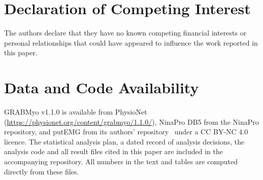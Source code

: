 \documentclass[final,5p,times,twocolumn]{elsarticle}
\newif\ifrevhighlight
\newcommand{\rev}[1]{\ifrevhighlight{\color{blue}#1}\else#1\fi}
\begin{document}







\section*{Declaration of Competing Interest}
The authors declare that they have no known competing financial interests or personal relationships that could have appeared to influence the work reported in this paper.

\section*{Data and Code Availability}
GRABMyo v1.1.0 is available from PhysioNet (\url{https://physionet.org/content/grabmyo/1.1.0/}), NinaPro DB5 from the NinaPro repository\rev{, and putEMG from its authors' repository~\cite{kaczmarek2019putemg} under a CC BY-NC 4.0 licence}. \rev{The statistical analysis plan, a dated record of analysis decisions, the analysis code and all result files cited in this paper are included in the accompanying repository. All numbers in the text and tables are computed directly from these files.}





\end{document}

